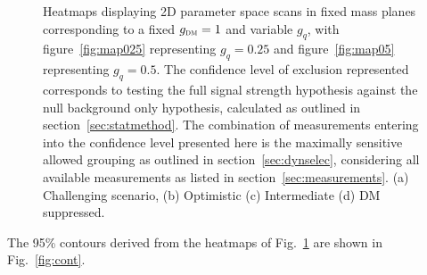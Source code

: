 \documentclass[floatfix]{article}
\begin{document}
\begin{figure}[hp]
    \caption{Heatmaps displaying 2D parameter space scans in fixed mass planes corresponding to a fixed $g_{\textsc{dm}} = 1$ and variable $g_{q}$, with
    figure~\ref{fig:map025} representing $g_{q}=0.25$ and figure~\ref{fig:map05} representing $g_{q}=0.5$. The confidence level of exclusion represented 
    corresponds to testing the full signal strength hypothesis against the null background only hypothesis, calculated as outlined in 
    section~\ref{sec:statmethod}. The combination of measurements entering into the confidence level presented here is the maximally
    sensitive allowed grouping as outlined in section~\ref{sec:dynselec}, considering all available measurements as listed in section~\ref{sec:measurements}.
    (a) Challenging scenario, (b) Optimistic (c) Intermediate (d) DM suppressed.}

    \label{fig:maps}
\end{figure}

The 95\% contours derived from the heatmaps of Fig.~\ref{fig:maps} are shown in Fig.~\ref{fig:cont}.
\end{document}
